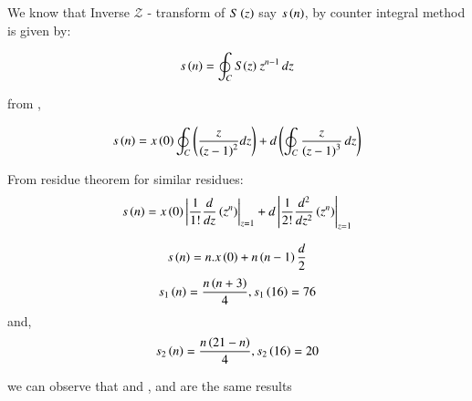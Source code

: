 \documentclass[beamer]{IEEEtran}
\theoremstyle{remark}
\begin{document}
We know that Inverse $\mathcal{Z}$ - transform of $S\left(z\right)$ say $s\left(n\right)$, by counter integral method is given by:

\begin{align}
s\left(n\right)=\oint_C S(z)\ z^{n-1}\, dz
\end{align}

from \brak{\ref{w1}},

\begin{align}
    s\left(n\right)=x\left(0\right)\oint_C \left(\frac{z}{\left(z-1\right)^2}dz\right) + d\left(\oint_C  \frac{z}{\left(z-1\right)^3} \, dz\right)
\end{align}

From residue theorem for similar residues:
\begin{align}
    s\left(n\right)=x\left(0\right)\left|\frac{1}{1!}\frac{d}{dz}\left(z^n\right)\right|_{z=1} + d\left|\frac{1}{2!}\frac{d^2}{dz^2}\left(z^n\right)\right|_{z=1}
\end{align}

\begin{align}
    s\left(n\right)=n.x\left(0\right) + n\left(n-1\right)\frac{d}{2}
\end{align}
\begin{align}
\label{39}
    s_1\left(n\right)=\frac{n\left(n+3\right)}{4},s_1\left(16\right)=76
\end{align}
and,
\begin{align}
\label{40}
    s_2\left(n\right)=\frac{n\left(21-n\right)}{4},s_2\left(16\right)=20
\end{align}

we can observe that \brak{\ref{11}} and \brak{\ref{39}},\brak{\ref{12}} and \brak{\ref{40}} are the same results
\end{document}
